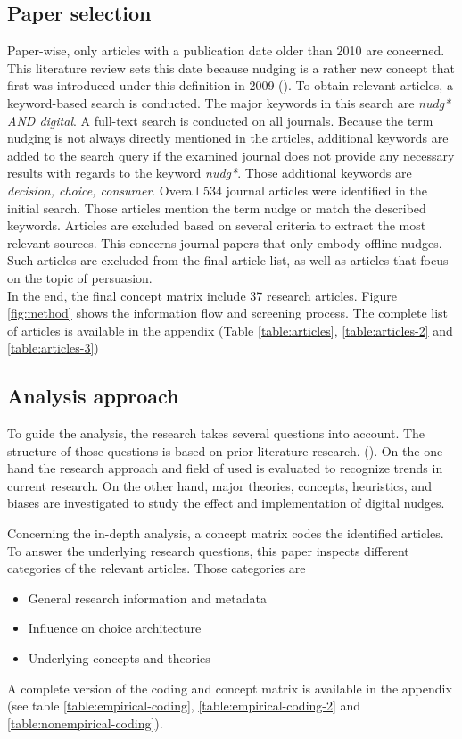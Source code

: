 \subsection{Paper selection}
Paper-wise, only articles with a publication date older than 2010 are concerned. This literature review sets this date because nudging is a rather new concept that first was introduced under this definition in 2009 (\cite{thaler_nudge:_2009}). To obtain relevant articles, a keyword-based search is conducted. The major keywords in this search are \textit{nudg* AND digital}. A full-text search is conducted on all journals. Because the term nudging is not always directly mentioned in the articles, additional keywords are added to the search query if the examined journal does not provide any necessary results with regards to the keyword \textit{nudg*}. Those additional keywords are \textit{decision, choice, consumer}. Overall 534 journal articles were identified in the initial search. Those articles mention the term nudge or match the described keywords. Articles are excluded based on several criteria to extract the most relevant sources. This concerns journal papers that only embody offline nudges. Such articles are excluded from the final article list, as well as articles that focus on the topic of persuasion. 
\\
In the end, the final concept matrix include 37 research articles. Figure \ref{fig:method} shows the information flow and screening process. The complete list of articles is available in the appendix (Table \ref{table:articles}, \ref{table:articles-2} and \ref{table:articles-3})

\subsection{Analysis approach}
To guide the analysis, the research takes several questions into account. The structure of those questions is based on prior literature research. (\cite{alavi_review_1992}). On the one hand the research approach and field of used is evaluated to recognize trends in current research. On the other hand, major theories, concepts, heuristics, and biases are investigated to study the effect and implementation of digital nudges.

Concerning the in-depth analysis, a concept matrix codes the identified articles. To answer the underlying research questions, this paper inspects different categories of the relevant articles. Those categories are 
\begin{itemize}
\item General research information and metadata
\item Influence on choice architecture
\item Underlying concepts and theories
\end{itemize}

A complete version of the coding and concept matrix is available in the appendix (see table \ref{table:empirical-coding}, \ref{table:empirical-coding-2} and \ref{table:nonempirical-coding}).